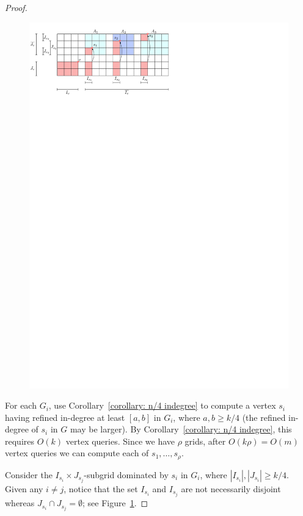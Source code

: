 \documentclass[a4paper,10pt]{article}
\newcommand{\indegree}{refined in-degree\xspace}
\begin{document}
\begin{proof}
\begin{figure}[tb]
\centering
\includegraphics{expansion_lemma_fig1.pdf}
\caption{\small }
\label{fig:Expansion Lemma 1}
\end{figure}

For each $G_i$, use Corollary~\ref{corollary: n/4 indegree} to compute a vertex $s_i$ having \indegree at least $[a,b]$ in $G_i$, where $a,b \geq k/4$ (the \indegree of $s_i$ in $G$ may be larger).
By Corollary~\ref{corollary: n/4 indegree}, this requires $O(k)$ vertex queries. Since we have $\rho$ grids, after $O(k\rho) = O(m)$ vertex queries we can compute each of $s_1, \ldots, s_\rho$.
 
Consider the $I_{s_i}\times J_{s_j}$-subgrid dominated by $s_i$ in $G_i$, where $|I_{s_i}|, |J_{s_i}| \geq k/4$. Given any $i\neq j$, notice that the set $I_{s_i}$ and $I_{s_j}$ are not necessarily disjoint whereas $J_{s_i}\cap J_{s_j} = \emptyset$; see Figure~\ref{fig:Expansion Lemma 1}.


\end{proof}
\end{document}
